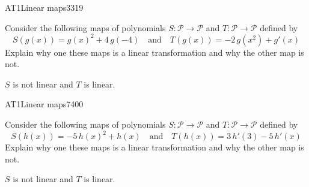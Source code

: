 \begin{exercise}{AT1}{Linear maps}{3319} 
\begin{exerciseStatement} 

 Consider the following maps of polynomials \(S:\mathcal{P}\rightarrow\mathcal{P}\) and \(T:\mathcal{P}\rightarrow\mathcal{P}\) defined by \[
            S(g(x))=
                    g\left(x\right)^{2} + 4 \, g\left(-4\right)
                \hspace{1em} \text{and} \hspace{1em}
            T(g(x))=
                    -2 \, g\left(x^{2}\right) + g'\left(x\right)
        \] Explain why one these maps is a linear transformation and why the other map is not. 

 \end{exerciseStatement}
 \begin{exerciseAnswer} 

\(S\) is not linear and \(T\) is linear.

 \end{exerciseAnswer}
 \end{exercise}


\begin{exercise}{AT1}{Linear maps}{7400} 
\begin{exerciseStatement} 

 Consider the following maps of polynomials \(S:\mathcal{P}\rightarrow\mathcal{P}\) and \(T:\mathcal{P}\rightarrow\mathcal{P}\) defined by \[
            S(h(x))=
                    -5 \, h\left(x\right)^{2} + h\left(x\right)
                \hspace{1em} \text{and} \hspace{1em}
            T(h(x))=
                    3 \, h'\left(3\right) - 5 \, h'\left(x\right)
        \] Explain why one these maps is a linear transformation and why the other map is not. 

 \end{exerciseStatement}
 \begin{exerciseAnswer} 

\(S\) is not linear and \(T\) is linear.

 \end{exerciseAnswer}
 \end{exercise}


